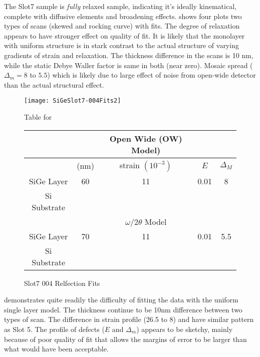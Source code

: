 The Slot7 sample is \emph{fully} relaxed sample, indicating it's ideally kinematical, complete with diffusive elements and broadening effects.   shows four plots two types of scans (skewed and rocking curve) with fits.  The degree of relaxation appears to have stronger effect on quality of fit.  It is likely that the monolayer with uniform structure is in stark contrast to the actual structure of varying gradients of strain and relaxation.  The thickness difference in the scans is 10 nm, while the static Debye Waller factor is same in both (near zero).  Mosaic spread ($\Delta_m =8$ to $5.5$) which is likely due to large effect of noise from open-wide detector than the actual structural effect.  


\begin{figure}[hc]%
\caption{Slot7 004 Relfection Fits}
\label{Slot7-004}
\begin{minipage}{0.85\linewidth}
\texttt{[image: SiGeSlot7-004Fits2]}
\end{minipage}
\begin{minipage}{\linewidth}
\centering
\vspace{10pt}
Table for \\
\vspace{5pt}
\begin{tabular}{c|cccc}
			& 	&Open Wide (OW) Model)	 \\
\hline
			&	(nm)	&	strain	 $(10^{-3})$&	$E$ &  $\Delta_M$\\
\hline
SiGe Layer		&  	60	&      11	 &0.01 & 8	\\
Si Substrate		&	\textemdash & \textemdash&\textemdash\ &\textemdash	\\
\hline
			& &$\omega/2\theta$ Model \\
\hline
SiGe Layer		&	70	& 11	&0.01	& 5.5	\\
Si Substrate		&	\textemdash & \textemdash&\textemdash\ &\textemdash
\end{tabular}
\end{minipage}
\end{figure}

 demonstrates quite readily the difficulty of fitting the data with the uniform single layer model.  The thickness continue to be 10nm difference between two types of scan.  The difference in strain profile  (26.5 to 8) and have similar pattern as Slot 5.  The profile of defects ($E$ and $\Delta_m$) appears to be sketchy, mainly because of poor quality of fit that allows the margins of error to  be larger than what would have been acceptable.

